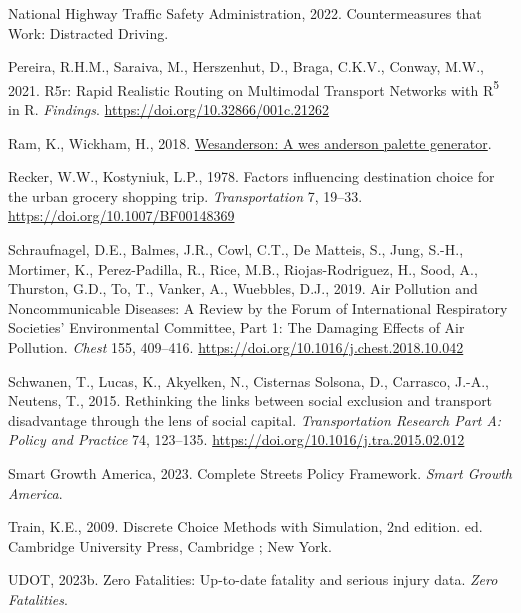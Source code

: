 \documentclass[
  letterpaper,
  DIV=11,
  numbers=noendperiod]{scrreport}
\newlength{\cslhangindent}
\newlength{\cslentryspacingunit} %
\newenvironment{CSLReferences}[2] %
 {%
  \setlength{\parindent}{0pt}
  \ifodd #1
  \let\oldpar\par
  \def\par{\hangindent=\cslhangindent\oldpar}
  \fi
  \setlength{\parskip}{#2\cslentryspacingunit}
 }%
 {}
\begin{document}
\begin{CSLReferences}{1}{0}
\leavevmode{}%
National Highway Traffic Safety Administration, 2022. Countermeasures
that {Work}: {Distracted Driving}.

\leavevmode{}%
Pereira, R.H.M., Saraiva, M., Herszenhut, D., Braga, C.K.V., Conway,
M.W., 2021. R5r: {Rapid Realistic Routing} on {Multimodal Transport
Networks} with {R}{\textsuperscript{5}} in {R}. \emph{Findings}.
\url{https://doi.org/10.32866/001c.21262}

\leavevmode{}%
Ram, K., Wickham, H., 2018.
\href{https://CRAN.R-project.org/package=wesanderson}{Wesanderson: A wes
anderson palette generator}.

\leavevmode{}%
Recker, W.W., Kostyniuk, L.P., 1978. Factors influencing destination
choice for the urban grocery shopping trip. \emph{Transportation} 7,
19--33. \url{https://doi.org/10.1007/BF00148369}

\leavevmode{}%
Schraufnagel, D.E., Balmes, J.R., Cowl, C.T., De Matteis, S., Jung,
S.-H., Mortimer, K., Perez-Padilla, R., Rice, M.B., Riojas-Rodriguez,
H., Sood, A., Thurston, G.D., To, T., Vanker, A., Wuebbles, D.J., 2019.
Air {Pollution} and {Noncommunicable Diseases}: {A Review} by the
{Forum} of {International Respiratory Societies}' {Environmental
Committee}, {Part} 1: {The Damaging Effects} of {Air Pollution}.
\emph{Chest} 155, 409--416.
\url{https://doi.org/10.1016/j.chest.2018.10.042}

\leavevmode{}%
Schwanen, T., Lucas, K., Akyelken, N., Cisternas Solsona, D., Carrasco,
J.-A., Neutens, T., 2015. Rethinking the links between social exclusion
and transport disadvantage through the lens of social capital.
\emph{Transportation Research Part A: Policy and Practice} 74, 123--135.
\url{https://doi.org/10.1016/j.tra.2015.02.012}

\leavevmode{}%
Smart Growth America, 2023. Complete {Streets Policy Framework}.
\emph{Smart Growth America}.

\leavevmode{}%
Train, K.E., 2009. Discrete {Choice Methods} with {Simulation}, 2nd
edition. ed. {Cambridge University Press}, {Cambridge ; New York}.

\leavevmode{}%
UDOT, 2023b. Zero {Fatalities}: {Up-to-date} fatality and serious injury
data. \emph{Zero Fatalities}.


\end{CSLReferences}
\end{document}
